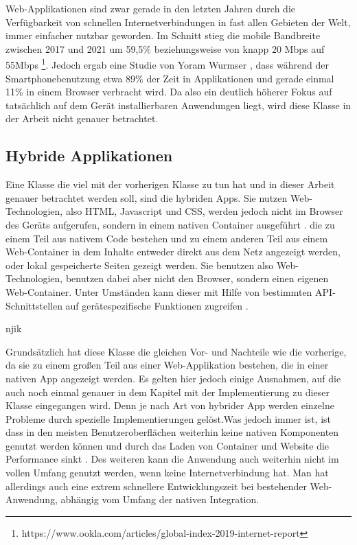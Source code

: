 Web-Applikationen sind zwar gerade in den letzten Jahren durch die Verfügbarkeit von schnellen Internetverbindungen in fast allen Gebieten der Welt, immer einfacher nutzbar geworden.
Im Schnitt stieg die mobile Bandbreite zwischen 2017 und 2021 um 59,5\% beziehungsweise von knapp 20 \ac{Mbps} auf 55\ac{Mbps} \footnote{https://www.ookla.com/articles/global-index-2019-internet-report}.
Jedoch ergab eine Studie von Yoram Wurmser \cite{report_webusage}, dass während der Smartphonebenutzung etwa 89\% der Zeit in Applikationen und gerade einmal 11\% in einem Browser verbracht wird.
Da also ein deutlich höherer Fokus auf tatsächlich auf dem Gerät installierbaren Anwendungen liegt, wird diese Klasse in der Arbeit nicht genauer betrachtet.

\subsection{Hybride Applikationen}
Eine Klasse die viel mit der vorherigen Klasse zu tun hat und in dieser Arbeit genauer betrachtet werden soll, sind die hybriden Apps. Sie nutzen Web-Technologien, also HTML, Javascript und CSS, werden jedoch nicht im Browser des Geräts aufgerufen, sondern in einem nativen Container ausgeführt \cite{IEEE_development_classes}. die zu einem Teil aus nativem Code bestehen und zu einem anderen Teil aus einem Web-Container in dem Inhalte entweder direkt aus dem Netz angezeigt werden, oder lokal gespeicherte Seiten gezeigt werden. Sie benutzen also Web-Technologien, benutzen dabei aber nicht den Browser, sondern einen eigenen Web-Container. Unter Umständen kann dieser mit Hilfe von bestimmten API-Schnittstellen auf gerätespezifische Funktionen zugreifen \cite{IEEE_development_classes}.

njik

Grundsätzlich hat diese Klasse die gleichen Vor- und Nachteile wie die vorherige, da sie zu einem großen Teil aus einer Web-Applikation bestehen, die in einer nativen App angezeigt werden. Es gelten hier jedoch einige Ausnahmen, auf die auch noch einmal genauer in dem Kapitel mit der Implementierung zu dieser Klasse eingegangen wird. Denn je nach Art von hybrider App werden einzelne Probleme durch spezielle Implementierungen gelöst.Was jedoch immer ist, ist dass in den meisten Benutzeroberflächen weiterhin keine nativen Komponenten genutzt werden können und durch das Laden von Container und Website die Performance sinkt \cite{IEEE_development_classes}. Des weiteren kann die Anwendung auch weiterhin nicht im vollen Umfang genutzt werden, wenn keine Internetverbindung hat. Man hat allerdings auch eine extrem schnellere Entwicklungszeit bei bestehender Web-Anwendung, abhängig vom Umfang der nativen Integration.

